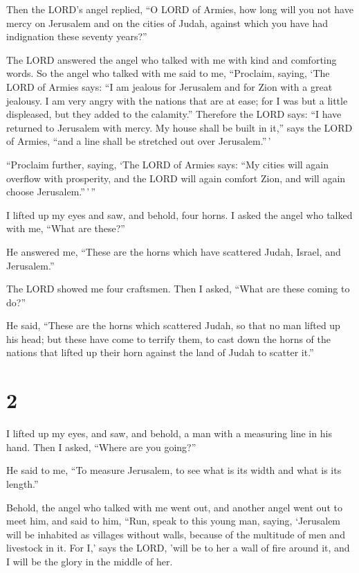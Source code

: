  Then the LORD's angel replied, ``O LORD of Armies, how
long will you not have mercy on Jerusalem and on the cities of Judah,
against which you have had indignation these seventy years?''

 The LORD answered the angel who talked with me with kind
and comforting words.  So the angel who talked with me said
to me, ``Proclaim, saying, `The LORD of Armies says: ``I am jealous for
Jerusalem and for Zion with a great jealousy.  I am very
angry with the nations that are at ease; for I was but a little
displeased, but they added to the calamity.''  Therefore
the LORD says: ``I have returned to Jerusalem with mercy. My house shall
be built in it,'' says the LORD of Armies, ``and a line shall be
stretched out over Jerusalem.''\,'

 ``Proclaim further, saying, `The LORD of Armies says: ``My
cities will again overflow with prosperity, and the LORD will again
comfort Zion, and will again choose Jerusalem.''\,'\,''

 I lifted up my eyes and saw, and behold, four horns.
 I asked the angel who talked with me, ``What are these?''

He answered me, ``These are the horns which have scattered Judah,
Israel, and Jerusalem.''

 The LORD showed me four craftsmen.  Then I
asked, ``What are these coming to do?''

He said, ``These are the horns which scattered Judah, so that no man
lifted up his head; but these have come to terrify them, to cast down
the horns of the nations that lifted up their horn against the land of
Judah to scatter it.''

\hypertarget{section-1}{%
\section{2}\label{section-1}}

 I lifted up my eyes, and saw, and behold, a man with a
measuring line in his hand.  Then I asked, ``Where are you
going?''

He said to me, ``To measure Jerusalem, to see what is its width and what
is its length.''

 Behold, the angel who talked with me went out, and another
angel went out to meet him,  and said to him, ``Run, speak
to this young man, saying, `Jerusalem will be inhabited as villages
without walls, because of the multitude of men and livestock in it.
 For I,' says the LORD, 'will be to her a wall of fire
around it, and I will be the glory in the middle of her.


